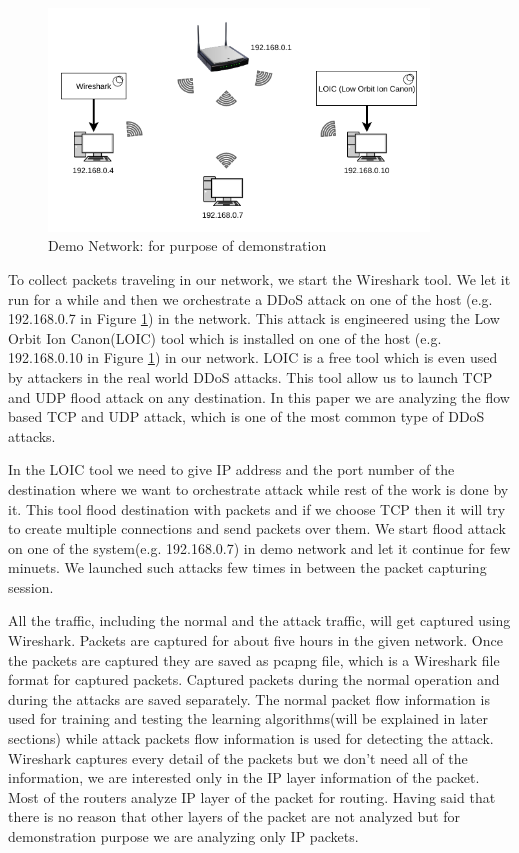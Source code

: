 \documentclass[10pt,oneside,a4paper]{article}
\begin{document}
\begin{figure}[H]
\centering
\includegraphics[width=0.90\textwidth]{demo_network}
\caption{Demo Network: for purpose of demonstration} \label{fig:demonetwork}
\end{figure}

To collect packets traveling in our network, we start the Wireshark tool. We let it run for a while and then we orchestrate a DDoS attack on one of the host (e.g. 192.168.0.7 in Figure \ref{fig:demonetwork}) in the network. This attack is engineered using the Low Orbit Ion Canon(LOIC) tool which is installed on one of the host (e.g. 192.168.0.10 in Figure \ref{fig:demonetwork}) in our network. LOIC is a free tool which is even used by attackers in the real world DDoS attacks. This tool allow us to launch TCP and UDP flood attack on any destination. In this paper we are analyzing the flow based TCP and UDP attack, which is one of the most common type of DDoS attacks.

In the LOIC tool we need to give IP address and the port number of the destination where we want to orchestrate attack while rest of the work is done by it. This tool flood destination with packets and if we choose TCP then it will try to create multiple connections and send packets over them. We start flood attack on one of the system(e.g. 192.168.0.7) in demo network and let it continue for few minuets. We launched such attacks few times in between the packet capturing session.

All the traffic, including the normal and the attack traffic, will get captured using Wireshark. Packets are captured for about five hours in the given network. Once the packets are captured they are saved as pcapng file, which is a Wireshark file format for captured packets. Captured packets during the normal operation and during the attacks are saved separately. The normal packet flow information is used for training and testing the learning algorithms(will be explained in later sections) while attack packets flow information is used for detecting the attack. Wireshark captures every detail of the packets but we don't need all of the information, we are interested only in the IP layer information of the packet. Most of the routers analyze IP layer of the packet for routing. Having said that there is no reason that other layers of the packet are not analyzed but for demonstration purpose we are analyzing only IP packets.\par
\end{document}
